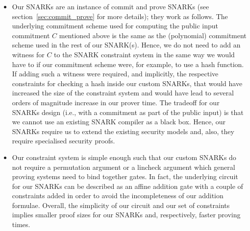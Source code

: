 \begin{itemize}
\item Our SNARKs are an instance of commit and prove SNARKs (see section~\ref{sec:commit_prove} for more details); they work as follows. 
The underlying commitment scheme used for computing the public input commitment $C$ mentioned above is the 
same as the (polynomial) commitment scheme used in the rest of our SNARK(s). Hence, we do not need to add an witness for $C$ 
to the SNARK constraint system in the same way we would have to if our commitment scheme were, for example, to use a hash function.
If adding such a witness were required, and implicitly, the respective constraints for checking a hash inside our custom SNARKs, 
that would have increased the size of the constraint system and would have lead to several orders of magnitude increase in our prover time. 
The tradeoff for our SNARKs design (i.e., with a commitment as part of the public input) is that we cannot use an existing SNARK compiler as a black box.  
Hence, our SNARKs require us to extend the existing security models and, also, they require specialised security proofs. 

\item Our constraint system is simple enough such that our custom SNARKs do not require a permutation argument or a lincheck argument 
which general proving systems need to bind together gates. In fact, the underlying circuit for our SNARKs can be described as an affine addition 
gate with a couple of constraints added in order to avoid the incompleteness of our addition formulae. Overall, the simplicity of our circuit and our 
set of constraints implies smaller proof sizes for our SNARKs and, respectively, faster proving times.
\end{itemize}

